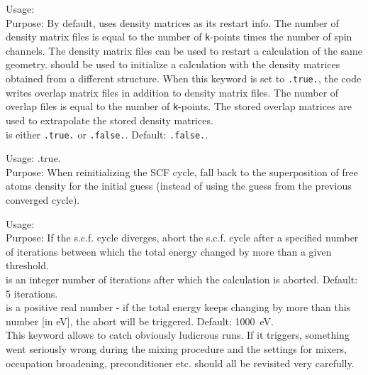 {
  \noindent
  Usage:   \\[1.0ex]
  Purpose: By default,  uses density matrices as its
    restart info. The number of density matrix files is equal to the number of
    \texttt{k}-points times the number of spin channels. The density matrix
    files can be used to restart a calculation of the same geometry.
     should be used to initialize a
    calculation with the density matrices obtained from a different structure.
    When this keyword is set to \texttt{.true.}, the code writes overlap matrix
    files in addition to density matrix files. The number of overlap files is
    equal to the number of \texttt{k}-points. The stored overlap matrices are
    used to extrapolate the stored density matrices. \\[1.0ex]
   is either \texttt{.true.} or \texttt{.false.}. Default:
  \texttt{.false.}. \\
}

{
  \noindent
  Usage:  .true. \\[1.0ex]
  Purpose: When reinitializing the SCF cycle, fall back
           to the superposition of free atoms density for
           the initial guess (instead of using the guess from
           the previous converged cycle). \\[1.0ex]
}

{
  \noindent
  Usage:    \\[1.0ex]
  Purpose: If the s.c.f. cycle diverges, abort the s.c.f. cycle after a
  specified number of iterations between which the total energy changed
  by more than a given threshold.\\[1.0ex]
   is an integer number of iterations after which the
  calculation is aborted. Default: 5 iterations. \\[1.0ex]
   is a positive real number - if the total energy
  keeps changing by more than this number [in eV], the abort will be
  triggered. Default: 1000~eV.\\
}
This keyword allows to catch obviously ludicrous runs. If it triggers,
something went seriously wrong during the mixing procedure and the
settings for mixers, occupation broadening, preconditioner etc. should
all be revisited very carefully.


